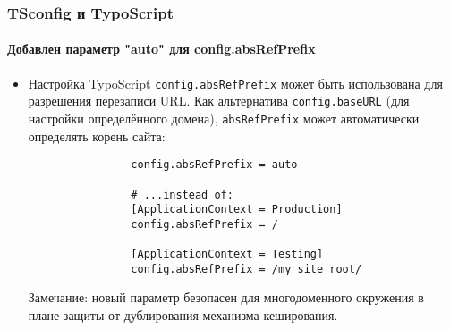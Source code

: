 \begin{frame}[fragile]
	\frametitle{TSconfig и TypoScript}
	\framesubtitle{Добавлен параметр "auto" для config.absRefPrefix}

	\begin{itemize}
		\item Настройка TypoScript \texttt{config.absRefPrefix} может быть использована для
			разрешения перезаписи URL. Как альтернатива \texttt{config.baseURL} (для настройки определённого
			домена), \texttt{absRefPrefix} может автоматически определять корень сайта:

			\begin{lstlisting}
				config.absRefPrefix = auto

				# ...instead of:
				[ApplicationContext = Production]
				config.absRefPrefix = /

				[ApplicationContext = Testing]
				config.absRefPrefix = /my_site_root/
			\end{lstlisting}

		\smaller
			Замечание: новый параметр безопасен для многодоменного окружения в плане защиты от дублирования механизма кеширования.
		\normalsize

	\end{itemize}

\end{frame}


